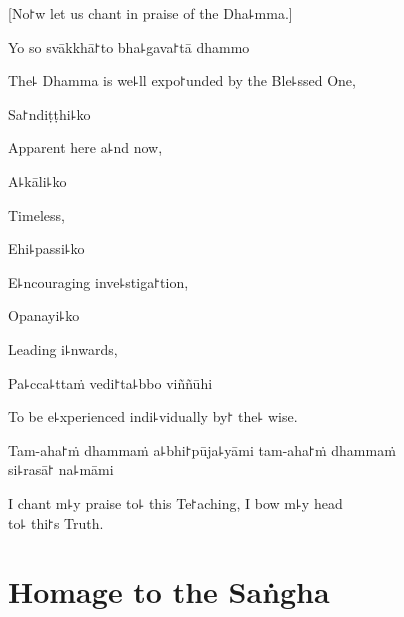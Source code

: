 \begin{leader}
\end{leader}

\begin{english}
  [No꜓w let us chant in praise of the Dha꜕mma.]
\end{english}

Yo so svākkhā꜓to bha꜕gava꜓tā dhammo

\begin{english}
  The꜕ Dhamma is we꜕ll expo꜓unded by the Ble꜕ssed One,
\end{english}

Sa꜓ndiṭṭhi꜕ko

\begin{english}
  Apparent here a꜕nd now,
\end{english}

A꜕kāli꜕ko

\begin{english}
  Timeless,
\end{english}

Ehi꜕passi꜕ko

\begin{english}
  E꜕ncouraging inve꜕stiga꜓tion,
\end{english}

Opanayi꜕ko

\begin{english}
  Leading i꜕nwards,
\end{english}

Pa꜕cca꜕ttaṁ vedi꜓ta꜕bbo viññūhi

\begin{english}
  To be e꜕xperienced indi꜕vidually by꜓ the꜕ wise.
\end{english}

Tam-aha꜓ṁ dhammaṁ a꜕bhi꜓pūja꜕yāmi tam-aha꜓ṁ dhammaṁ \\si꜕rasā꜓ na꜕māmi

\begin{english}
  I chant m꜕y praise to꜕ this Te꜓aching, I bow m꜕y head\\ to꜕ thi꜓s Truth.
\end{english}

\clearpage

\chapter{Homage to the Saṅgha}

\begin{leader}
\end{leader}

